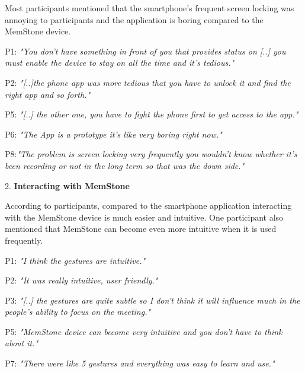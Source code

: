 \documentclass[mscthesis]{usiinfthesis}
\begin{document}
Most participants mentioned that the smartphone's frequent screen locking was annoying to participants and the application is boring compared to the MemStone device. 
\hspace{\parindent}\begin{adjustwidth}{1cm}{1cm}
\hspace{\parindent}P1: \textit{"You don't have something in front of you that provides status on [..] you must enable the device to stay on all the time and it's tedious."}

P2: \textit{"[..]the phone app was more tedious that you have to unlock it and find the right app and so forth."}

P5: \textit{"[..] the other one, you have to fight the phone first to get access to the app."}

P6: \textit{"The App is a prototype it's like very boring right now."}

P8:\textit{"The problem is screen locking very frequently you wouldn't know whether it’s been recording or not in the long term so that was the down side."}
\newline
\end{adjustwidth}

2. \textbf{Interacting with MemStone}

According to participants, compared to the smartphone application interacting with the MemStone device is much easier and intuitive. One participant also mentioned that MemStone can become even more intuitive when it is used frequently. 
\hspace{\parindent}\begin{adjustwidth}{1cm}{1cm}
\hspace{\parindent}P1: \textit{"I think the gestures are intuitive."}

P2: \textit{"It was really intuitive, user friendly."}

P3: \textit{"[..] the gestures are quite subtle so I don't think it will influence much in the people's ability to focus on the meeting."}

P5: \textit{"MemStone device can become very intuitive and you don't have to think about it."}

P7: \textit{"There were like 5 gestures and everything was easy to learn and use."}
\newline
\end{adjustwidth}
\end{document}

